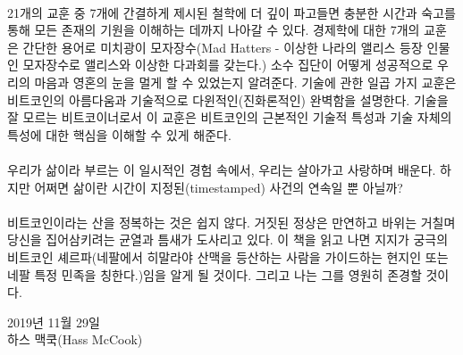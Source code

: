 \paragraph{}
21개의 교훈 중 7개에 간결하게 제시된 철학에 더 깊이 파고들면 충분한 시간과 숙고를 통해 모든 존재의 기원을 이해하는 데까지 나아갈 수 있다. 
경제학에 대한 7개의 교훈은 간단한 용어로 미치광이 모자장수(Mad Hatters - 이상한 나라의 앨리스 등장 인물인 모자장수로 앨리스와 이상한 다과회를 갖는다.) 소수 집단이 어떻게 성공적으로 우리의 마음과 영혼의 눈을 멀게 할 수 있었는지 알려준다. 
기술에 관한 일곱 가지 교훈은 비트코인의 아름다움과 기술적으로 다윈적인(진화론적인) 완벽함을 설명한다. 
기술을 잘 모르는 비트코이너로서 이 교훈은 비트코인의 근본적인 기술적 특성과 기술 자체의 특성에 대한 핵심을 이해할 수 있게 해준다.

\paragraph{}
우리가 삶이라 부르는 이 일시적인 경험 속에서, 우리는 살아가고 사랑하며 배운다. 
하지만 어쩌면 삶이란 시간이 지정된(timestamped) 사건의 연속일 뿐 아닐까? 

\paragraph{}
비트코인이라는 산을 정복하는 것은 쉽지 않다. 거짓된 정상은 만연하고 바위는 거칠며 당신을 집어삼키려는 균열과 틈새가 도사리고 있다.
이 책을 읽고 나면 지지가 궁극의 비트코인 셰르파(네팔에서 히말라야 산맥을 등산하는 사람을 가이드하는 현지인 또는 네팔 특정 민족을 칭한다.)임을 알게 될 것이다. 
그리고 나는 그를 영원히 존경할 것이다. 

\begin{flushright}
	2019년 11월 29일 \\
	하스 맥쿡(Hass McCook)
\end{flushright}
